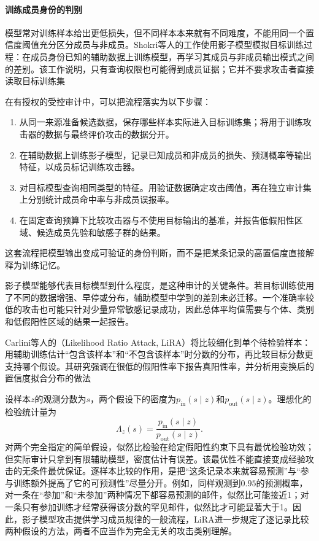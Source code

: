 \paragraph{训练成员身份的判别}

模型常对训练样本给出更低损失，但不同样本本来就有不同难度，不能用同一个置信度阈值充分区分成员与非成员。Shokri等人的工作使用影子模型模拟目标训练过程：在成员身份已知的辅助数据上训练模型，再学习其成员与非成员输出模式之间的差别。该工作说明，只有查询权限也可能得到成员证据；它并不要求攻击者直接读取目标训练集

在有授权的受控审计中，可以把流程落实为以下步骤：
\begin{enumerate}
 \item 从同一来源准备候选数据，保存哪些样本实际进入目标训练集；将用于训练攻击器的数据与最终评价攻击的数据分开。
 \item 在辅助数据上训练影子模型，记录已知成员和非成员的损失、预测概率等输出特征，以成员标记训练攻击器。
 \item 对目标模型查询相同类型的特征。用验证数据确定攻击阈值，再在独立审计集上分别统计成员命中率与非成员误报率。
 \item 在固定查询预算下比较攻击器与不使用目标输出的基准，并报告低假阳性区域、候选成员先验和敏感子群的结果。
\end{enumerate}
这套流程把模型输出变成可验证的身份判断，而不是把某条记录的高置信度直接解释为训练记忆。

影子模型能够代表目标模型到什么程度，是这种审计的关键条件。若目标训练使用了不同的数据增强、早停或分布，辅助模型中学到的差别未必迁移。一个准确率较低的攻击也可能只针对少量异常敏感记录成功，因此总体平均值需要与个体、类别和低假阳性区域的结果一起报告。

Carlini等人的（Likelihood Ratio Attack, LiRA）将比较细化到单个待检验样本：用辅助训练估计“包含该样本”和“不包含该样本”时分数的分布，再比较目标分数更支持哪个假设。其研究强调在很低的假阳性率下报告真阳性率，并分析用变换后的置信度拟合分布的做法

设样本$z$的观测分数为$s$，两个假设下的密度为$p_{\mathrm{in}}(s\mid z)$和$p_{\mathrm{out}}(s\mid z)$。理想化的检验统计量为
\begin{equation}
 \Lambda_z(s)=
 \frac{p_{\mathrm{in}}(s\mid z)}
      {p_{\mathrm{out}}(s\mid z)}.
 \label{eq:privacy-membership-likelihood}
\end{equation}
对两个完全指定的简单假设，似然比检验在给定假阳性约束下具有最优检验功效；但实际审计只拿到有限辅助模型，密度估计有误差。该最优性不能直接变成经验攻击的无条件最优保证。逐样本比较的作用，是把“这条记录本来就容易预测”与“参与训练额外提高了它的可预测性”尽量分开。例如，同样观测到$0.95$的预测概率，对一条在“参加”和“未参加”两种情况下都容易预测的邮件，似然比可能接近1；对一条只有参加训练才经常获得该分数的罕见邮件，似然比才可能显著大于1。因此，影子模型攻击提供学习成员规律的一般流程，LiRA进一步规定了逐记录比较两种假设的方法，两者不应当作为完全无关的攻击类别理解。


